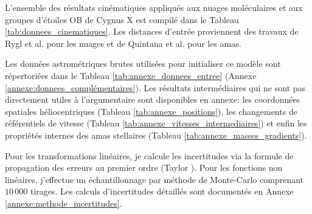 \documentclass[a4paper, 11pt]{article}
\begin{document}
	L'ensemble des résultats cinématiques appliqués aux nuages moléculaires et aux groupes d'étoiles OB de Cygnus X est compilé dans le Tableau \ref{tab:donnees_cinematiques}. Les distances d'entrée proviennent des travaux de Rygl et al. \cite{rygl2012} pour les nuages et de Quintana et al. \cite{quintana2021} pour les amas. 
	
	Les données astrométriques brutes utilisées pour initialiser ce modèle sont répertoriées dans le Tableau \ref{tab:annexe_donnees_entree} (Annexe \ref{annexe:donnees_complémentaires}). Les résultats intermédiaires qui ne sont pas directement utiles à l'argumentaire sont disponibles en annexe: les coordonnées spatiales héliocentriques (Tableau \ref{tab:annexe_positions}), les changements de référentiels de vitesse (Tableau \ref{tab:annexe_vitesses_intermediaires}) et enfin les propriétés internes des amas stellaires (Tableau \ref{tab:annexe_masses_gradients}).
	
	Pour les transformations linéaires, je calcule les incertitudes via la formule de propagation des erreurs au premier ordre (Taylor \cite{taylor1997}). Pour les fonctions non linéaires, j'effectue un échantillonnage par méthode de Monte-Carlo comprenant $10\,000$ tirages. Les calculs d'incertitudes détaillés sont documentés en Annexe \ref{annexe:methode_incertitudes}.
\end{document}
